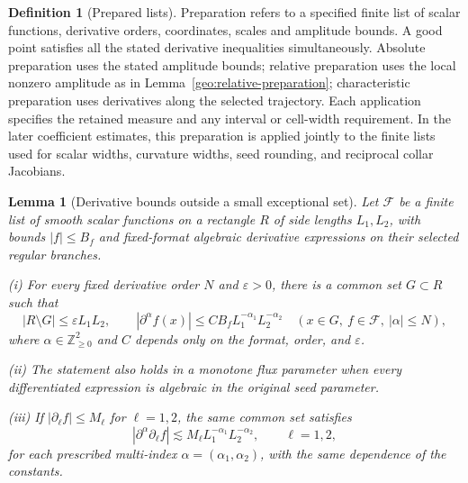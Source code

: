 \documentclass[11pt]{amsart}
\newtheorem{lemma}[theorem]{Lemma}
\theoremstyle{definition}
\newtheorem{definition}{Definition}[section]
\theoremstyle{remark}
\numberwithin{equation}{section}
\begin{document}
\begin{definition}[Prepared lists]\label{def:preparation}
Preparation refers to a specified finite list of scalar functions, derivative orders, coordinates, scales and amplitude bounds. A good point satisfies all the stated derivative inequalities simultaneously. Absolute preparation uses the stated amplitude bounds; relative preparation uses the local nonzero amplitude as in Lemma~\ref{geo:relative-preparation}; characteristic preparation uses derivatives along the selected trajectory. Each application specifies the retained measure and any interval or cell-width requirement. In the later coefficient estimates, this preparation is applied jointly to the finite lists used for scalar widths, curvature widths, seed rounding, and reciprocal collar Jacobians.
\end{definition}
\begin{lemma}[Derivative bounds outside a small exceptional set]\label{geo:preparation}
Let $\mathcal F$ be a finite list of smooth scalar functions on a rectangle $R$ of side lengths $L_1,L_2$, with bounds $|f|\le B_f$ and fixed-format algebraic derivative expressions on their selected regular branches.

\noindent\textup{(i)} For every fixed derivative order $N$ and $\varepsilon>0$, there is a common set $G\subset R$ such that
\[
|R\setminus G|\le\varepsilon L_1L_2,\qquad |\partial^\alpha f(x)|\le C B_f L_1^{-\alpha_1}L_2^{-\alpha_2}\quad(x\in G,\ f\in\mathcal F,\ |\alpha|\le N),
\]
where $\alpha\in\mathbb{Z}_{\ge0}^2$ and $C$ depends only on the format, order, and $\varepsilon$.

\noindent\textup{(ii)} The statement also holds in a monotone flux parameter when every differentiated expression is algebraic in the original seed parameter.

\noindent\textup{(iii)} If $|\partial_\ell f|\le M_\ell$ for $\ell=1,2$, the same common set satisfies
\[
|\partial^\alpha\partial_\ell f|\lesssim M_\ell L_1^{-\alpha_1}L_2^{-\alpha_2},\qquad \ell=1,2,
\]
for each prescribed multi-index $\alpha=(\alpha_1,\alpha_2)$, with the same dependence of the constants.
\end{lemma}
\end{document}
